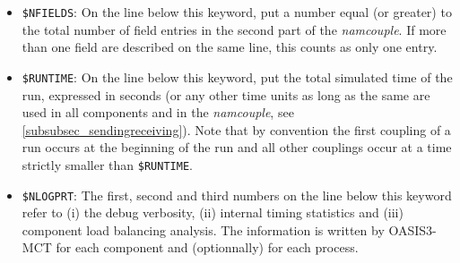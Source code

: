 \begin{itemize}

\item {\tt \$NFIELDS}: On the line below this keyword, put a number equal (or greater) to the total
  number of field entries in the second part of the {\it
    namcouple}. If more than one field are described on the same line, this
  counts as only one entry.

%

\item {\tt \$RUNTIME}: On the line below this keyword, put the total
  simulated time of the run, expressed in seconds (or any other time
  units as long as the same are used in all components and in the {\it
    namcouple}, see \ref{subsubsec_sendingreceiving}). Note that by convention the first coupling of a run occurs at the beginning of the run and all other couplings occur at a time strictly smaller than {\tt \$RUNTIME}.

\item {\tt \$NLOGPRT}: The first, second and third numbers on the line below
  this keyword refer to (i) the debug verbosity, (ii) internal timing statistics
  and (iii) component load balancing analysis. The information is written by OASIS3-MCT
  for each component and (optionnally) for each process.
  

\end{itemize}
